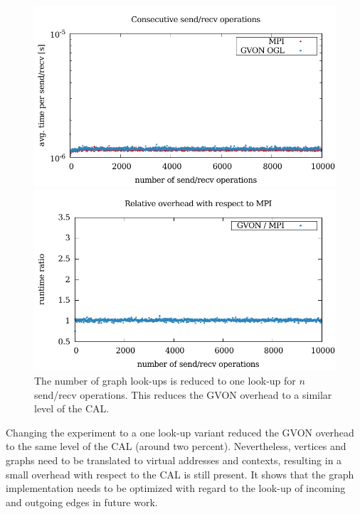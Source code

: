 \begin{figure}[H]
  \begin{minipage}[t]{0.5\textwidth} 
    \includegraphics[width=\textwidth]{plots/50_nsend_one_lookup_laser}
  \end{minipage}%
  \begin{minipage}[t]{0.5\textwidth}
    \includegraphics[width=\textwidth]{plots/50_nsend_one_lookup_overhead_gvon_laser}
  \end{minipage}%
  \caption{The number of graph look-ups is reduced to one look-up for
    $n$ send/recv operations.  This reduces the GVON overhead to
    a similar level of the CAL.}
  \label{fig:nsend_one_lookup_kepler}
\end{figure}

\noindent Changing the experiment to a one look-up variant reduced
the GVON overhead to the same level of the CAL (around two
percent). Nevertheless, vertices and graphs need to be translated to
virtual addresses and contexts, resulting in a small overhead with
respect to the CAL is still present. It shows that the graph
implementation needs to be optimized with regard to the look-up of
incoming and outgoing edges in future work.

